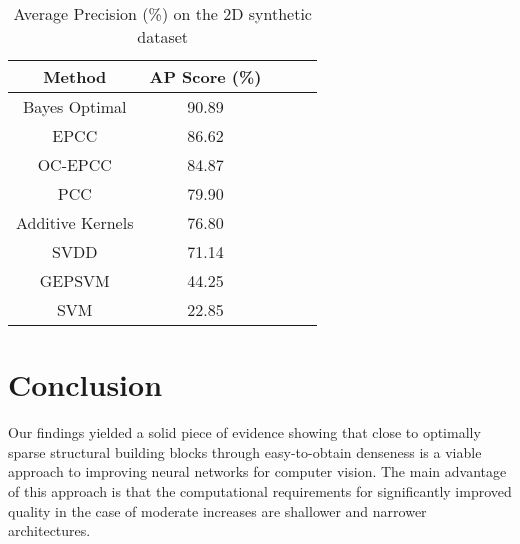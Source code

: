 \documentclass[10pt,twocolumn,letterpaper]{article}
\begin{document}
\begin{table}[tp]%
	\centering 
	\caption{Average Precision (\%) on the 2D synthetic dataset}\label{table1}
	\tabcolsep 0.0001in 
	\begin{tabular} {|c|c|c|c|c|}
		\hline
		
		Method& AP Score (\%)\\
			\hline	\hline
		Bayes Optimal &90.89\\
			\hline
		EPCC &86.62\\
			\hline
		OC-EPCC& 84.87\\
			\hline
		PCC &79.90\\
			\hline
		Additive Kernels& 76.80\\
			\hline
		SVDD &71.14\\
			\hline
		GEPSVM& 44.25\\
			\hline
		SVM &22.85
\\
	
		\hline
	\end{tabular}
\end{table}
\section{Conclusion}
Our findings yielded a solid piece of evidence showing that close to optimally sparse structural building blocks through easy-to-obtain denseness is a viable approach to improving neural networks for computer vision. The main advantage of this approach is that the computational requirements for significantly improved quality in the case of moderate increases are shallower and narrower architectures.


{\small
	
	} 
\end{document}

